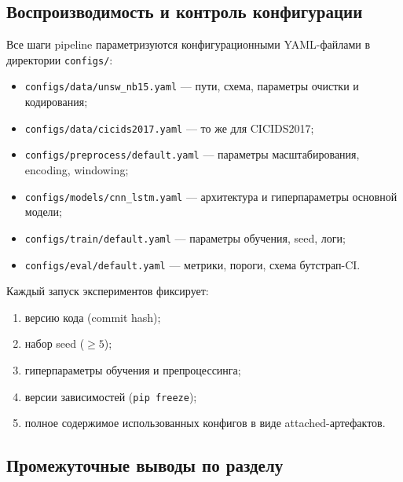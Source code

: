 \subsection{Воспроизводимость и контроль конфигурации}

Все шаги pipeline параметризуются конфигурационными YAML-файлами в
директории \texttt{configs/}:

\begin{itemize}
    \item \texttt{configs/data/unsw\_nb15.yaml} --- пути, схема, параметры
    очистки и кодирования;
    \item \texttt{configs/data/cicids2017.yaml} --- то же для CICIDS2017;
    \item \texttt{configs/preprocess/default.yaml} --- параметры
    масштабирования, encoding, windowing;
    \item \texttt{configs/models/cnn\_lstm.yaml} --- архитектура и
    гиперпараметры основной модели;
    \item \texttt{configs/train/default.yaml} --- параметры обучения,
    seed, логи;
    \item \texttt{configs/eval/default.yaml} --- метрики, пороги, схема
    бутстрап-CI.
\end{itemize}

Каждый запуск экспериментов фиксирует:
\begin{enumerate}
    \item версию кода (commit hash);
    \item набор seed (\(\geq 5\));
    \item гиперпараметры обучения и препроцессинга;
    \item версии зависимостей (\texttt{pip freeze});
    \item полное содержимое использованных конфигов в виде attached-артефактов.
\end{enumerate}

\subsection{Промежуточные выводы по разделу}

